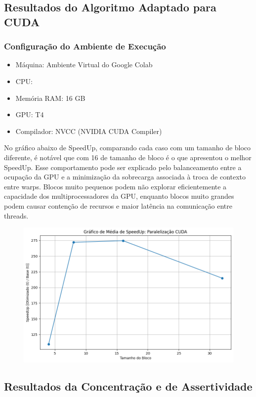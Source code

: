 \subsection{Resultados do Algoritmo Adaptado para CUDA}
\subsubsection{Configuração do Ambiente de Execução}
\begin{itemize}
    \item Máquina: Ambiente Virtual do Google Colab
    \item CPU:
    \item Memória RAM: 16 GB
    \item GPU: T4
    \item Compilador: NVCC (NVIDIA CUDA Compiler)
\end{itemize}

No gráfico abaixo de SpeedUp, comparando cada caso com um tamanho de bloco diferente, é notável que com 16 de tamanho de bloco é o que apresentou o melhor SpeedUp. Esse comportamento pode ser explicado pelo balanceamento entre a ocupação da GPU e a minimização da sobrecarga associada à troca de contexto entre warps. Blocos muito pequenos podem não explorar eficientemente a capacidade dos multiprocessadores da GPU, enquanto blocos muito grandes podem causar contenção de recursos e maior latência na comunicação entre threads.

\begin{figure}[H]
    \centering
    \includegraphics[width=1\linewidth]{../assets/CUDA - SpeedUp.png}
\end{figure}

\subsection{Resultados da Concentração e de Assertividade}

